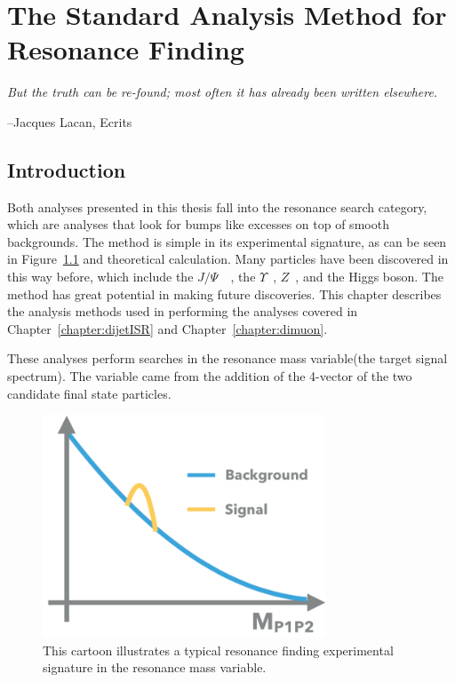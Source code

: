 \chapter{The Standard Analysis Method for Resonance Finding}
\label{chapter:analysismethod}

\epigraph{\textit{But the truth can be re-found; most often it has already been written elsewhere.}}{--Jacques Lacan, Ecrits}


\section{Introduction}
Both analyses presented in this thesis fall into the resonance search category, which are analyses that look for bumps like excesses on top of smooth backgrounds. The method is simple in its experimental signature, as can be seen in Figure~\ref{fig:bump} and theoretical calculation. Many particles have been discovered in this way before, which include the $J/\Psi$~\cite{PhysRevLett.33.1406}~\cite{PhysRevLett.33.1404}, the $\Upsilon$~\cite{Herb:1977ek}, $Z$~\cite{hollik1984composite}, and the Higgs boson. The method has great potential in making future discoveries. This chapter describes
the analysis methods used in performing the analyses covered in Chapter~\ref{chapter:dijetISR} and Chapter~\ref{chapter:dimuon}. 

These analyses perform searches in the resonance mass variable(the target signal spectrum). The variable came from the addition of the 4-vector of the two candidate final state particles.

\begin{figure}[!htb]
    \begin{center}
        \includegraphics[width=0.75\textwidth]{figures/chapter_analysismethod/resonance}
        \caption{
            This cartoon illustrates a typical resonance finding experimental signature in the resonance mass variable. 
        }
        \label{fig:bump}
    \end{center}
\end{figure}
\FloatBarrier


